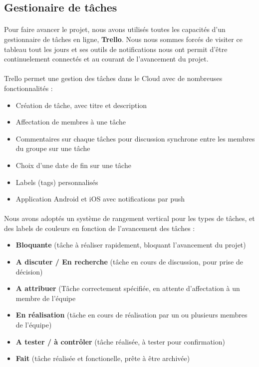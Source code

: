 \subsection{Gestionaire de tâches}

\paragraph{}
Pour faire avancer le projet, nous avons utilisés toutes les capacités d’un gestionnaire de tâches en ligne, \textbf{Trello}. Nous nous sommes forcés de visiter ce tableau tout les jours et ses outils de notifications nous ont permit d’être continuelement connectés et au courant de l’avancement du projet.

\paragraph{}
Trello permet une gestion des tâches dans le Cloud avec de nombreuses fonctionnalités :
\begin{itemize}
\item Création de tâche, avec titre et description
\item Affectation de membres à une tâche
\item Commentaires sur chaque tâches pour discussion synchrone entre les membres du groupe sur une tâche
\item Choix d’une date de fin sur une tâche
\item Labels (tags) personnalisés
\item Application Android et iOS avec notifications par push
\end{itemize}

\paragraph{}
Nous avons adoptés un système de rangement vertical pour les types de tâches, et des labels de couleurs en fonction de l’avancement des tâches :

\begin{itemize}
\item \textbf{Bloquante} (tâche à réaliser rapidement, bloquant l’avancement du projet)
\item \textbf{A discuter / En recherche} (tâche en cours de discussion, pour prise de décision)
\item \textbf{A attribuer} (Tâche correctement spécifiée, en attente d’affectation à un membre de l’équipe
\item \textbf{En réalisation} (täche en cours de réalisation par un ou plusieurs membres de l’équipe)
\item \textbf{A tester / à contrôler} (tâche réalisée, à tester pour confirmation)
\item \textbf{Fait} (tâche réalisée et fonctionelle, prête à être archivée)
\end{itemize}

